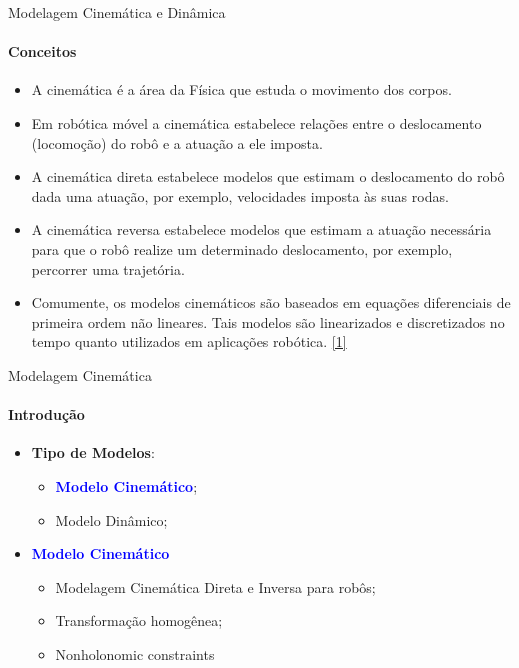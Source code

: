 \documentclass{beamer}
\begin{document}
\begin{frame}{Modelagem Cinemática e Dinâmica}
    \framesubtitle{Conceitos}
    \begin{itemize}
        \item A cinemática é a área da Física que estuda o movimento dos corpos.
        \item Em robótica móvel a cinemática estabelece relações entre o deslocamento
        (locomoção) do robô e a atuação a ele imposta.
        \item A cinemática direta estabelece modelos que estimam o deslocamento do robô
        dada uma atuação, por exemplo, velocidades imposta às suas rodas.
        \item A cinemática reversa estabelece modelos que estimam a atuação necessária
        para que o robô realize um determinado deslocamento, por exemplo, percorrer
        uma trajetória.
        \item Comumente, os modelos cinemáticos são baseados em equações diferenciais
        de primeira ordem não lineares. Tais modelos são linearizados e discretizados
        no tempo quanto utilizados em aplicações robótica. \href{http://143.106.148.168:9080/Cursos/IA368N/01-16/cinematica2.pdf}{[1]}
    \end{itemize}
\end{frame}


\begin{frame}{Modelagem Cinemática}
    \framesubtitle{Introdução}
    \setlength\extrarowheight{5pt}
    \begin{itemize}
        \item \textbf{Tipo de Modelos}:
        \begin{itemize}
            \item \textbf{\textcolor{blue}{Modelo Cinemático}};
            \item Modelo Dinâmico;
        \end{itemize}
        \item \textbf{\textcolor{blue}{Modelo Cinemático}}
        \begin{itemize}
            \item Modelagem Cinemática Direta e Inversa para robôs;
            \item Transformação homogênea;
            \item Nonholonomic constraints
        \end{itemize}
    \end{itemize}
\end{frame}
\end{document}
